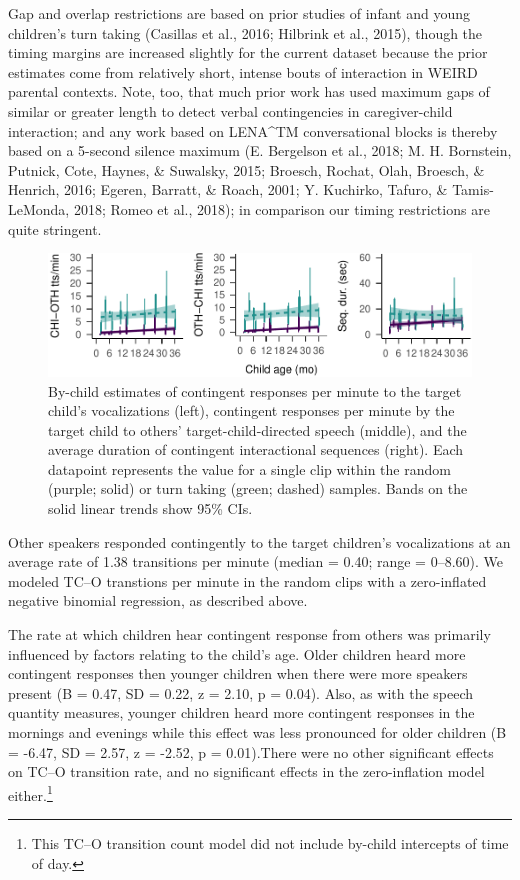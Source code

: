 \documentclass[floatsintext,man]{apa6}
\theoremstyle{definition}
\theoremstyle{definition}
\theoremstyle{definition}
\theoremstyle{remark}
\begin{document}
Gap and overlap restrictions are based on prior studies of infant and
young children's turn taking (Casillas et al., 2016; Hilbrink et al.,
2015), though the timing margins are increased slightly for the current
dataset because the prior estimates come from relatively short, intense
bouts of interaction in WEIRD parental contexts. Note, too, that much
prior work has used maximum gaps of similar or greater length to detect
verbal contingencies in caregiver-child interaction; and any work based
on LENA\^{}TM conversational blocks is thereby based on a 5-second
silence maximum (E. Bergelson et al., 2018; M. H. Bornstein, Putnick,
Cote, Haynes, \& Suwalsky, 2015; Broesch, Rochat, Olah, Broesch, \&
Henrich, 2016; Egeren, Barratt, \& Roach, 2001; Y. Kuchirko, Tafuro, \&
Tamis-LeMonda, 2018; Romeo et al., 2018); in comparison our timing
restrictions are quite stringent.

\begin{figure}
\centering
\includegraphics{Tseltal-CLE_files/figure-latex/fig6-1.pdf}
\caption{\label{fig:fig6}By-child estimates of contingent responses per
minute to the target child's vocalizations (left), contingent responses
per minute by the target child to others' target-child-directed speech
(middle), and the average duration of contingent interactional sequences
(right). Each datapoint represents the value for a single clip within
the random (purple; solid) or turn taking (green; dashed) samples. Bands
on the solid linear trends show 95\% CIs.}
\end{figure}

Other speakers responded contingently to the target children's
vocalizations at an average rate of 1.38 transitions per minute (median
= 0.40; range = 0--8.60). We modeled TC--O transtions per minute in the
random clips with a zero-inflated negative binomial regression, as
described above.

The rate at which children hear contingent response from others was
primarily influenced by factors relating to the child's age. Older
children heard more contingent responses then younger children when
there were more speakers present (B = 0.47, SD = 0.22, z = 2.10, p =
0.04). Also, as with the speech quantity measures, younger children
heard more contingent responses in the mornings and evenings while this
effect was less pronounced for older children (B = -6.47, SD = 2.57, z =
-2.52, p = 0.01).There were no other significant effects on TC--O
transition rate, and no significant effects in the zero-inflation model
either.\footnote{This TC--O transition count model did not include
  by-child intercepts of time of day.}
\end{document}
